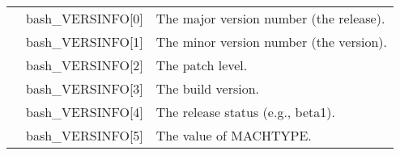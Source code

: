 \begin{longtable}{p{}p{}p{}}

 & bash\_VERSINFO[0] &
The major version number (the release). \\

 & bash\_VERSINFO[1] &

The minor version number (the version). \\

 & bash\_VERSINFO[2] &

The patch level. \\

 & bash\_VERSINFO[3] &

The build version. \\

 & bash\_VERSINFO[4] &

The release status (e.g., beta1). \\

 & bash\_VERSINFO[5] &

The value of MACHTYPE. \\
\end{longtable}

